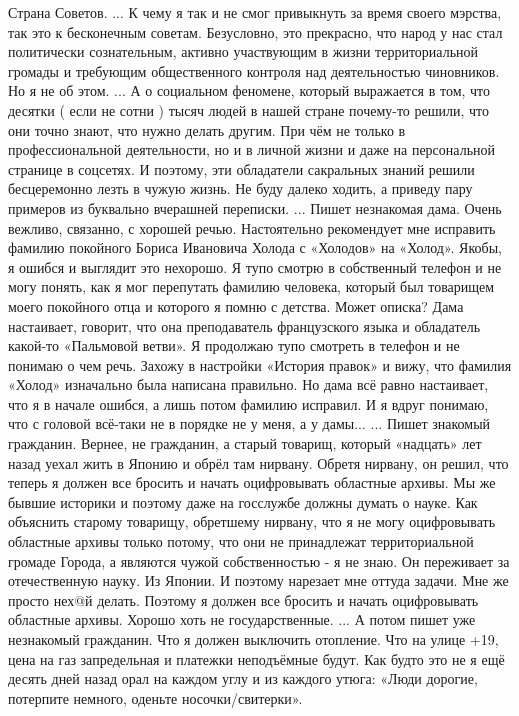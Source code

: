 \obeycr
Страна Советов.
...
К чему я так и не смог привыкнуть за время своего мэрства, так это к бесконечным советам.
Безусловно, это прекрасно, что народ у нас стал политически сознательным, активно участвующим в жизни территориальной громады и требующим общественного контроля над деятельностью чиновников.
Но я не об этом. 
...
А о социальном феномене, который выражается в том, что десятки ( если не сотни ) тысяч людей в нашей стране почему-то решили, что они точно знают, что нужно делать другим.
При чём не только в профессиональной деятельности, но и в личной жизни и даже на персональной странице в соцсетях. 
И поэтому, эти обладатели сакральных знаний решили бесцеремонно лезть в чужую жизнь.
Не буду далеко ходить, а приведу пару примеров из буквально вчерашней переписки.
...
Пишет незнакомая дама. 
Очень вежливо, связанно, с хорошей речью.
Настоятельно рекомендует мне исправить фамилию покойного Бориса Ивановича Холода с «Холодов» на «Холод». Якобы, я ошибся и выглядит это нехорошо.
Я тупо смотрю в собственный телефон и не могу понять, как я мог перепутать фамилию человека, который был товарищем моего покойного отца и которого я помню с детства.
Может описка?
Дама настаивает, говорит, что она преподаватель французского языка и обладатель какой-то «Пальмовой ветви». 
Я продолжаю тупо смотреть в телефон и не понимаю о чем речь. Захожу в настройки «История правок» и вижу, что фамилия «Холод» изначально была написана правильно.
Но дама всё равно настаивает, что я в начале ошибся, а лишь потом фамилию исправил. И я вдруг понимаю, что с головой всё-таки не в порядке не у меня, а у дамы...
...
Пишет знакомый гражданин. 
Вернее, не гражданин, а старый товарищ, который «надцать» лет назад уехал жить в Японию и обрёл там нирвану.
Обретя нирвану, он решил, что теперь я должен все бросить и начать оцифровывать областные архивы. 
Мы же бывшие историки и поэтому даже на госслужбе должны думать о науке.
Как объяснить старому товарищу, обретшему нирвану, что я не могу оцифровывать областные архивы только потому, что они не принадлежат территориальной громаде Города, а являются чужой собственностью - я не знаю.
Он переживает за отечественную науку. 
Из Японии.
И поэтому нарезает мне оттуда задачи.
Мне же просто нех@й делать. 
Поэтому я должен все бросить и начать  оцифровывать областные архивы. 
Хорошо хоть не государственные.
...
А потом пишет уже незнакомый гражданин.
Что я должен выключить отопление. 
Что на улице +19, цена на газ запредельная и платежки неподъёмные будут.
Как будто это не я ещё десять дней назад орал на каждом углу и из каждого утюга: «Люди дорогие, потерпите немного, оденьте носочки/свитерки».
